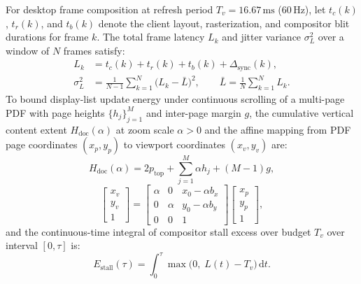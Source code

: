\documentclass[10pt,twocolumn,letterpaper]{article}
\begin{document}
For desktop frame composition at refresh period $T_v = 16.67\,\mathrm{ms}$ (60\,Hz), let $t_c(k)$, $t_r(k)$, and $t_b(k)$ denote the client layout, rasterization, and compositor blit durations for frame $k$. The total frame latency $L_k$ and jitter variance $\sigma_L^2$ over a window of $N$ frames satisfy:
\begin{align}
  L_k &= t_c(k) + t_r(k) + t_b(k) + \Delta_{\text{sync}}(k), \label{eq:latency} \\
  \sigma_L^2 &= \frac{1}{N-1}\sum_{k=1}^{N}\bigl(L_k - \bar{L}\bigr)^2, \qquad
  \bar{L} = \frac{1}{N}\sum_{k=1}^{N} L_k.
\end{align}
To bound display-list update energy under continuous scrolling of a multi-page PDF with page heights $\{h_j\}_{j=1}^{M}$ and inter-page margin $g$, the cumulative vertical content extent $H_{\text{doc}}(\alpha)$ at zoom scale $\alpha > 0$ and the affine mapping from PDF page coordinates $(x_p, y_p)$ to viewport coordinates $(x_v, y_v)$ are:
\begin{equation}
  H_{\text{doc}}(\alpha) = 2p_{\text{top}} + \sum_{j=1}^{M} \alpha h_j + (M-1)g,
\end{equation}
\begin{equation}
  \begin{bmatrix} x_v \\ y_v \\ 1 \end{bmatrix}
  =
  \begin{bmatrix}
    \alpha & 0 & x_0 - \alpha b_x \\
    0 & \alpha & y_0 - \alpha b_y \\
    0 & 0 & 1
  \end{bmatrix}
  \begin{bmatrix} x_p \\ y_p \\ 1 \end{bmatrix},
\end{equation}
and the continuous-time integral of compositor stall excess over budget $T_v$ over interval $[0,\tau]$ is:
\begin{equation}
  E_{\text{stall}}(\tau) = \int_{0}^{\tau} \max\!\bigl(0,\; L(t) - T_v\bigr)\,\mathrm{d}t.
  \label{eq:stall}
\end{equation}
\end{document}
